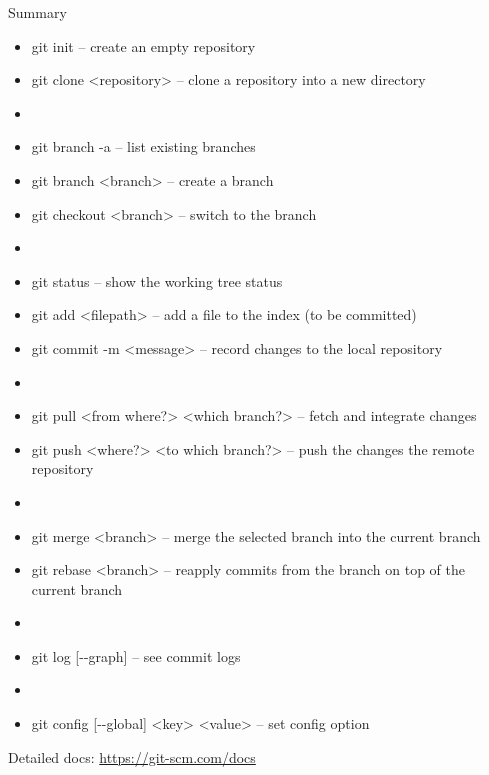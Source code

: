\begin{frame}{Summary}
	\begin{tiny}
    \begin{itemize}
        \item[] {\color{eclipseBlue}git init} -- create an empty repository
        \item[] {\color{eclipseBlue}git clone <repository>} -- clone a repository into a new directory
        \item[]
        \item[] {\color{eclipseBlue}git branch -a} -- list existing branches
        \item[] {\color{eclipseBlue}git branch <branch>} -- create a branch
        \item[] {\color{eclipseBlue}git checkout <branch>} -- switch to the branch 
        \item[]
        \item[] {\color{eclipseBlue}git status} -- show the working tree status
        \item[] {\color{eclipseBlue}git add <filepath>} -- add a file to the index (to be committed)
        \item[] {\color{eclipseBlue}git commit -m <message>} -- record changes to the local repository
        \item[]
        \item[] {\color{eclipseBlue}git pull <from where?> <which branch?>} -- fetch and integrate changes
        \item[] {\color{eclipseBlue}git push <where?> <to which branch?>} -- push the changes the remote repository
        \item[]
        \item[] {\color{eclipseBlue}git merge <branch>} -- merge the selected branch into the current branch
        \item[] {\color{eclipseBlue}git rebase <branch>} -- reapply commits from the branch on top of the current branch
        \item[]
        \item[] {\color{eclipseBlue}git log [-{}-graph]} -- see commit logs
        \item[]
        \item[] {\color{eclipseBlue}git config [-{}-global] <key> <value>} -- set config option
    \end{itemize}
    
    \begin{center}
    	Detailed docs: \url{https://git-scm.com/docs}
    \end{center}
    \end{tiny}
\end{frame}
